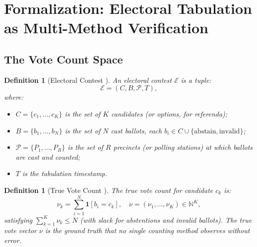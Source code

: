 \documentclass[11pt,a4paper]{article}
\newtheorem{definition}[theorem]{Definition}
\theoremstyle{definition}
\newcommand{\N}{\mathbb{N}}
\newcommand{\ind}[1]{\mathbf{1}[#1]}
\begin{document}
\section{Formalization: Electoral Tabulation as Multi-Method Verification}
\label{sec:formalization}
\subsection{The Vote Count Space}
\begin{definition}[Electoral Contest ]
\label{def:contest}
An electoral contest $\mathcal{E}$ is a tuple:
\begin{equation}
    \mathcal{E} = (C, B, \mathcal{P}, T),
    \label{eq:contest}
\end{equation}
where:
\begin{itemize}
    \item $C = \{c_1, \ldots, c_K\}$ is the set of $K$ candidates (or options, for referenda);
    \item $B = \{b_1, \ldots, b_N\}$ is the set of $N$ cast ballots, each $b_i \in C \cup \{\text{abstain}, \text{invalid}\}$;
    \item $\mathcal{P} = \{P_1, \ldots, P_R\}$ is the set of $R$ precincts (or polling stations) at which ballots are cast and counted;
    \item $T$ is the tabulation timestamp.
\end{itemize}
\end{definition}
\begin{definition}[True Vote Count ]
\label{def:true_vote}
The true vote count for candidate $c_k$ is:
\begin{equation}
    \nu_k = \sum_{i=1}^{N} \ind{b_i = c_k}, \quad \nu = (\nu_1, \ldots, \nu_K) \in \N^K,
    \label{eq:true_vote}
\end{equation}
satisfying $\sum_{k=1}^K \nu_k \leq N$ (with slack for abstentions and invalid ballots). The true vote vector $\nu$ is the ground truth that no single counting method observes without error.
\end{definition}
\end{document}
